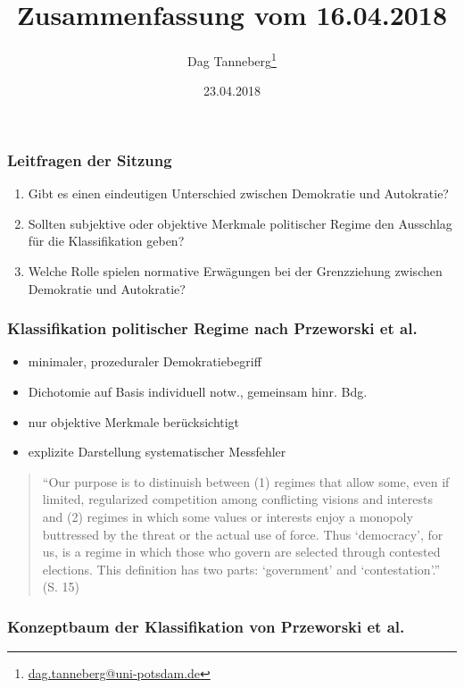 \documentclass{beamer}
\title{Zusammenfassung vom 16.04.2018}
\author{Dag Tanneberg\thanks{%
  \href{mailto:dag.tanneberg@uni-potsdam.de}%
    {dag.tanneberg@uni-potsdam.de}
  }
}
\institute[Universität Potsdam]{
  {\glqq}Wie erkl\"art man autorit\"are Herrschaft?{\grqq}\\
  Universität Potsdam\\
  Lehrstuhl für Vergleichende Politikwissenschaft\\
  Sommersemester 2018
}
\date{23.04.2018}
\begin{document}
\maketitle

\begin{frame}
  \frametitle{Leitfragen der Sitzung}
  \begin{enumerate}
    \item Gibt es einen eindeutigen Unterschied zwischen
      Demokratie und Autokratie?
    \item Sollten subjektive oder objektive Merkmale
      politischer Regime den Ausschlag für die Klassifikation
      geben?
    \item Welche Rolle spielen normative Erwägungen bei der
      Grenzziehung zwischen Demokratie und Autokratie?
  \end{enumerate}
\end{frame}

\begin{frame}
  \frametitle{Klassifikation politischer Regime nach Przeworski et al.}
  \begin{itemize}
    \item minimaler, prozeduraler Demokratiebegriff
    \item Dichotomie auf Basis individuell notw., gemeinsam hinr. Bdg.
    \item nur objektive Merkmale berücksichtigt
    \item explizite Darstellung systematischer Messfehler
  \end{itemize}

  \begin{quote}
    \normalfont
    \small
    ``Our purpose is to distinuish between (1) regimes that
    allow some, even if limited, regularized competition
    among conflicting visions and interests and (2) regimes
    in which some values or interests enjoy a monopoly
    buttressed by the threat or the actual use of force.
    Thus `democracy', for us, is a regime in which those who
    govern are selected through contested elections. This
    definition has two parts: `government' and
    `contestation'.'' (S. 15)
  \end{quote}
\end{frame}

\begin{frame}
  \frametitle{Konzeptbaum der Klassifikation von Przeworski et al.}
  \begin{figure}[t]
    
  \end{figure}
\end{frame}
\end{document}
